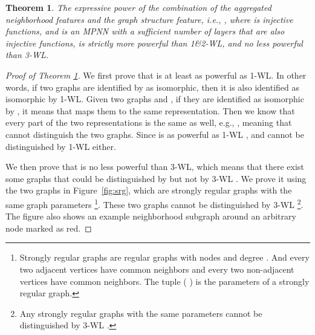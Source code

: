 \documentclass{article}
\theoremstyle{plain}
\newtheorem{theorem}{Theorem}
\begin{document}
\begin{theorem} \label{thm:powerful}
The expressive power of the combination of the aggregated neighborhood features and the graph structure feature, i.e., , where  is injective functions, and  is an MPNN with a sufficient number of layers that are also injective functions, is strictly more powerful than 1\&2-WL, and no less powerful than 3-WL. 
\end{theorem}
\vspace{-10pt}
\begin{proof}[Proof of Theorem \ref{thm:powerful}] 
We first prove that  is at least as powerful as 1-WL. 
In other words, if two graphs are identified by  as isomorphic, then it is also identified as isomorphic by 1-WL. 
Given two graphs  and ,  if they are identified as isomorphic by , it means that  maps them to the same representation. 
Then we know that every part of the two representations is the same as well, e.g., , meaning that  cannot distinguish the two graphs. Since  is as powerful as 1-WL \cite{maron2019provably, azizian2020expressive},  and  cannot be distinguished by 1-WL either.

We then prove that  is no less powerful than 3-WL, which means that there exist some graphs that could be distinguished by  but not by 3-WL \cite{chen2020can}. 
We prove it using the two graphs in Figure~\ref{fig:srg}, which are strongly regular graphs with the same graph parameters  \footnote{Strongly regular graphs are regular graphs with  nodes and degree . And every two adjacent vertices have  common neighbors and every two non-adjacent vertices have  common neighbors. The tuple ( ) is the parameters of a strongly regular graph.}. These two graphs cannot be distinguished by 3-WL \footnote{Any strongly regular graphs with the same parameters cannot be distinguished by 3-WL \cite{arvind2020weisfeiler}.}. 
The figure also shows an example neighborhood subgraph around an arbitrary node marked as red. 


\end{proof}
\end{document}
